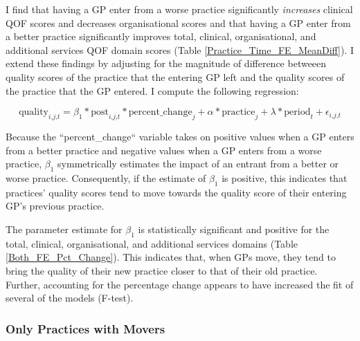 \documentclass[11pt]{article}
\newcommand{\mc}{\textrm{,}}
\begin{document}
\begin{landscape}

\end{landscape}


I find that having a GP enter from a worse practice significantly \emph{increases} clinical QOF scores and decreases organisational scores and that having a GP enter from a better practice significantly improves total, clinical, organisational, and additional services QOF domain scores (Table \ref{Practice_Time_FE_MeanDiff}). I extend these findings by adjusting for the magnitude of difference betweeen quality scores of the practice that the entering GP left and the quality scores of the practice that the GP entered. I compute the following regression:

\begin{equation} \label{eq:1}
\textrm{quality}_{i\textrm{,} j \mc t} = \beta_{1}*\textrm{post}_{i \mc j \mc t}*\textrm{percent\_change}_{j} + \alpha*\textrm{practice}_{j} + \lambda*\textrm{period}_{t} + \epsilon_{i \mc j \mc t}
\end{equation}

Because the ``percent\_change`` variable takes on positive values when a GP enters from a better practice and negative values when a GP enters from a worse practice, $\beta_1$ symmetrically estimates the impact of an entrant from a better or worse practice. Consequently, if the estimate of $\beta_1$ is positive, this indicates that practices' quality scores tend to move towards the quality score of their entering GP's previous practice.

The parameter estimate for $\beta_1$ is statistically significant and positive for the total, clinical, organisational, and additional services domains (Table \ref{Both_FE_Pct_Change}). This indicates that, when GPs move, they tend to bring the quality of their new practice closer to that of their old practice. Further, accounting for the percentage change appears to have increased the fit of several of the models (F-test).

\begin{landscape}

\end{landscape}

\subsubsection{Only Practices with Movers}
\end{document}
